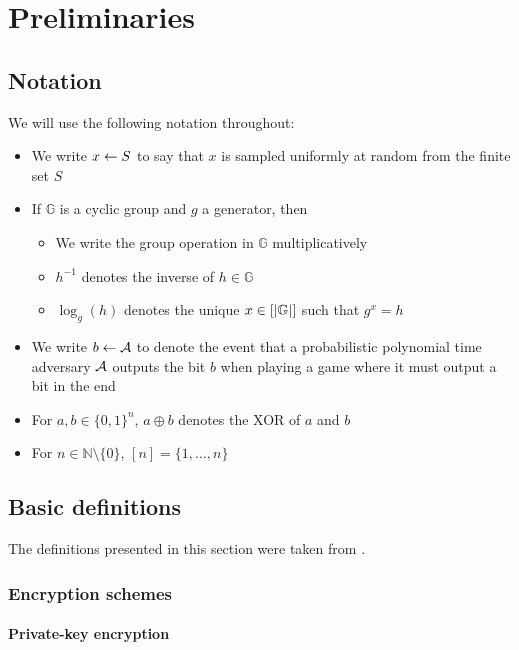 \chapter{Preliminaries}

\section{Notation}

We will use the following notation throughout:
\begin{itemize}
	\item We write $x \leftarrow S$ to say that $x$ is sampled uniformly at random from the finite set $S$
	\item If $\mathbb{G}$ is a cyclic group and $g$ a generator, then
	      \begin{itemize}
		      \item We write the group operation in $\mathbb{G}$ multiplicatively
		      \item $h^{-1}$ denotes the inverse of $h \in \mathbb{G}$
		      \item $\log_g(h)$ denotes the unique $x \in [\lvert\mathbb{G}\rvert]$ such that $g^x = h$
	      \end{itemize}
	\item We write $b \leftarrow \mathcal{A}$ to denote the event that a probabilistic polynomial time adversary $\mathcal{A}$ outputs the bit $b$ when playing a game where it must output a bit in the end
	\item For $a, b \in \{0, 1\}^n$, $a \oplus b$ denotes the XOR of $a$ and $b$
	\item For $n \in \mathbb{N} \setminus \{0\}$, $[n] = \{1, \ldots, n\}$
\end{itemize}


\section{Basic definitions}

The definitions presented in this section were taken from \cite{introduction-to-modern-cryptography}.

\subsection{Encryption schemes}

\subsubsection{Private-key encryption}

